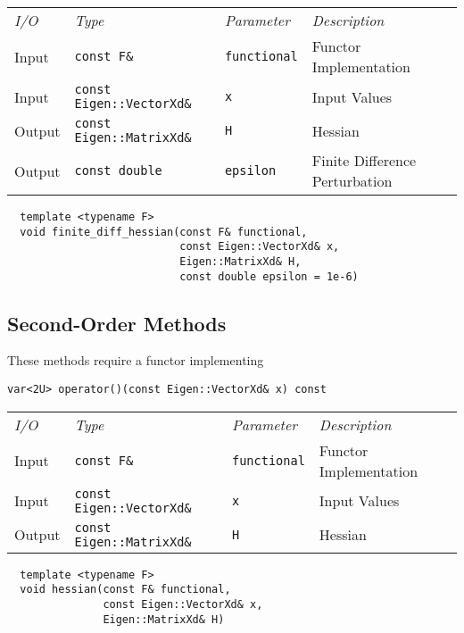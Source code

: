 \begin{tcolorbox}[colback=white,colframe=gray90, coltitle=black,boxrule=3pt,
fonttitle=\bfseries,title=Finite Difference Hessian]

\begin{tabular}{llll}
\textit{I/O} & \textit{Type} & \textit{Parameter} & \textit{Description} \\
Input & \texttt{const F\&} & \texttt{functional} & Functor Implementation \\
Input & \texttt{const Eigen::VectorXd\&} & \texttt{x} & Input Values \\
Output & \texttt{const Eigen::MatrixXd\&} & \texttt{H} & Hessian \\
Output & \texttt{const double} & \texttt{epsilon} & Finite Difference Perturbation
\end{tabular}

\vspace{5mm}

\begin{verbatim}
  template <typename F>
  void finite_diff_hessian(const F& functional,
                           const Eigen::VectorXd& x,
                           Eigen::MatrixXd& H,
                           const double epsilon = 1e-6)
\end{verbatim}

\end{tcolorbox}

\subsection{Second-Order Methods}

These methods require a functor implementing
%
\begin{verbatim}
var<2U> operator()(const Eigen::VectorXd& x) const
\end{verbatim}

\begin{tcolorbox}[colback=white,colframe=gray90, coltitle=black,boxrule=3pt,
fonttitle=\bfseries,title=Hessian]

\begin{tabular}{llll}
\textit{I/O} & \textit{Type} & \textit{Parameter} & \textit{Description} \\
Input & \texttt{const F\&} & \texttt{functional} & Functor Implementation \\
Input & \texttt{const Eigen::VectorXd\&} & \texttt{x} & Input Values \\
Output & \texttt{const Eigen::MatrixXd\&} & \texttt{H} & Hessian
\end{tabular}

\vspace{5mm}

\begin{verbatim}
  template <typename F>
  void hessian(const F& functional,
               const Eigen::VectorXd& x,
               Eigen::MatrixXd& H)
\end{verbatim}

\end{tcolorbox}

